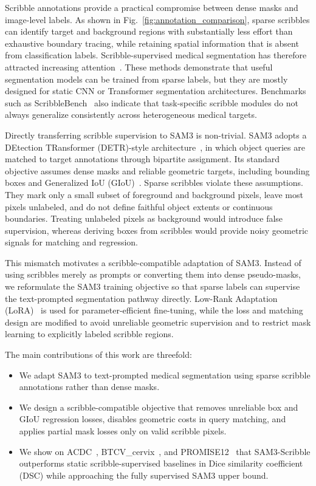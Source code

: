 \documentclass[preprint,12pt]{elsarticle}
\begin{document}
Scribble annotations provide a practical compromise between dense masks and image-level labels. As shown in Fig.~\ref{fig:annotation_comparison}, sparse scribbles can identify target and background regions with substantially less effort than exhaustive boundary tracing, while retaining spatial information that is absent from classification labels. Scribble-supervised medical segmentation has therefore attracted increasing attention~\cite{han2024DMSPS,li2024ScribFormer,liu2025effdnet}. These methods demonstrate that useful segmentation models can be trained from sparse labels, but they are mostly designed for static CNN or Transformer segmentation architectures. Benchmarks such as ScribbleBench~\cite{gotkowski2025scribblebench} also indicate that task-specific scribble modules do not always generalize consistently across heterogeneous medical targets.

Directly transferring scribble supervision to SAM3 is non-trivial. SAM3 adopts a DEtection TRansformer (DETR)-style architecture~\cite{carion2020detr,hatamizadeh2022unetr}, in which object queries are matched to target annotations through bipartite assignment. Its standard objective assumes dense masks and reliable geometric targets, including bounding boxes and Generalized IoU (GIoU)~\cite{rezatofighi2019giou}. Sparse scribbles violate these assumptions. They mark only a small subset of foreground and background pixels, leave most pixels unlabeled, and do not define faithful object extents or continuous boundaries. Treating unlabeled pixels as background would introduce false supervision, whereas deriving boxes from scribbles would provide noisy geometric signals for matching and regression.

This mismatch motivates a scribble-compatible adaptation of SAM3. Instead of using scribbles merely as prompts or converting them into dense pseudo-masks, we reformulate the SAM3 training objective so that sparse labels can supervise the text-prompted segmentation pathway directly. Low-Rank Adaptation (LoRA)~\cite{hu2021lora} is used for parameter-efficient fine-tuning, while the loss and matching design are modified to avoid unreliable geometric supervision and to restrict mask learning to explicitly labeled scribble regions.

The main contributions of this work are threefold:
\begin{itemize}
\item We adapt SAM3 to text-prompted medical segmentation using sparse scribble annotations rather than dense masks.
\item We design a scribble-compatible objective that removes unreliable box and GIoU regression losses, disables geometric costs in query matching, and applies partial mask losses only on valid scribble pixels.
\item We show on ACDC~\cite{bernard2018acdc}, BTCV\_cervix~\cite{landman2015btcv}, and PROMISE12~\cite{litjens2014promise} that SAM3-Scribble outperforms static scribble-supervised baselines in Dice similarity coefficient (DSC) while approaching the fully supervised SAM3 upper bound.
\end{itemize}
\end{document}
